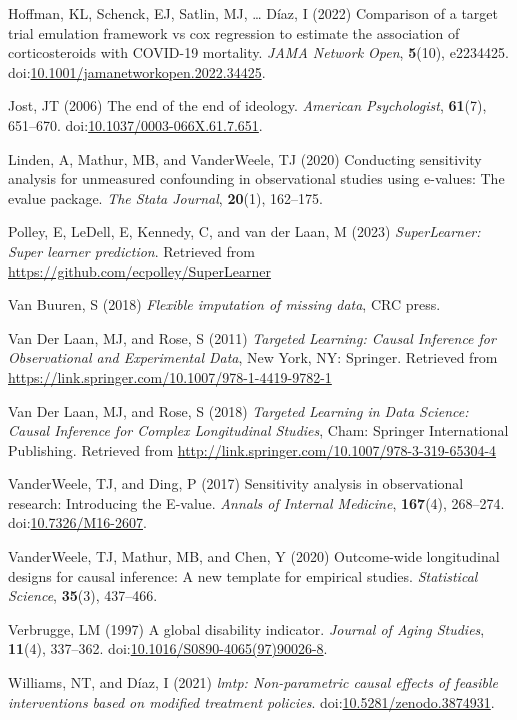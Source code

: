 \documentclass[
  singlecolumn]{article}
\newlength{\cslhangindent}
\newenvironment{CSLReferences}[2] %
 {\begin{list}{}{%
  \setlength{\itemindent}{0pt}
  \setlength{\leftmargin}{0pt}
  \setlength{\parsep}{0pt}
  \ifodd #1
   \setlength{\leftmargin}{\cslhangindent}
   \setlength{\itemindent}{-1\cslhangindent}
  \fi
  \setlength{\itemsep}{#2\baselineskip}}}
 {\end{list}}
\begin{document}
\begin{CSLReferences}{1}{0}
Hoffman, KL, Schenck, EJ, Satlin, MJ, \ldots{} Díaz, I (2022) Comparison
of a target trial emulation framework vs cox regression to estimate the
association of corticosteroids with COVID-19 mortality. \emph{JAMA
Network Open}, \textbf{5}(10), e2234425.
doi:\href{https://doi.org/10.1001/jamanetworkopen.2022.34425}{10.1001/jamanetworkopen.2022.34425}.

Jost, JT (2006) The end of the end of ideology. \emph{American
Psychologist}, \textbf{61}(7), 651--670.
doi:\href{https://doi.org/10.1037/0003-066X.61.7.651}{10.1037/0003-066X.61.7.651}.

Linden, A, Mathur, MB, and VanderWeele, TJ (2020) Conducting sensitivity
analysis for unmeasured confounding in observational studies using
e-values: The evalue package. \emph{The Stata Journal}, \textbf{20}(1),
162--175.

Polley, E, LeDell, E, Kennedy, C, and van der Laan, M (2023)
\emph{SuperLearner: Super learner prediction}. Retrieved from
\url{https://github.com/ecpolley/SuperLearner}

Van Buuren, S (2018) \emph{Flexible imputation of missing data}, CRC
press.

Van Der Laan, MJ, and Rose, S (2011) \emph{Targeted Learning: Causal
Inference for Observational and Experimental Data}, New York, NY:
Springer. Retrieved from
\url{https://link.springer.com/10.1007/978-1-4419-9782-1}

Van Der Laan, MJ, and Rose, S (2018) \emph{Targeted Learning in Data
Science: Causal Inference for Complex Longitudinal Studies}, Cham:
Springer International Publishing. Retrieved from
\url{http://link.springer.com/10.1007/978-3-319-65304-4}

VanderWeele, TJ, and Ding, P (2017) Sensitivity analysis in
observational research: Introducing the {E}-value. \emph{Annals of
Internal Medicine}, \textbf{167}(4), 268--274.
doi:\href{https://doi.org/10.7326/M16-2607}{10.7326/M16-2607}.

VanderWeele, TJ, Mathur, MB, and Chen, Y (2020) Outcome-wide
longitudinal designs for causal inference: A new template for empirical
studies. \emph{Statistical Science}, \textbf{35}(3), 437--466.

Verbrugge, LM (1997) A global disability indicator. \emph{Journal of
Aging Studies}, \textbf{11}(4), 337--362.
doi:\href{https://doi.org/10.1016/S0890-4065(97)90026-8}{10.1016/S0890-4065(97)90026-8}.

Williams, NT, and Díaz, I (2021) \emph{{l}mtp: Non-parametric causal
effects of feasible interventions based on modified treatment policies}.
doi:\href{https://doi.org/10.5281/zenodo.3874931}{10.5281/zenodo.3874931}.

\end{CSLReferences}
\end{document}
